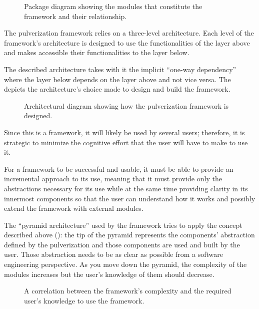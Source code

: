 \begin{figure}
    \centering
    \caption{Package diagram showing the modules that constitute the framework and their relationship.}
    \label{fig:package-diagram}
\end{figure}

The pulverization framework relies on a three-level architecture. Each level of the framework's architecture is designed to use the functionalities
of the layer above and makes accessible their functionalities to the layer below.

The described architecture takes with it the implicit ``one-way dependency'' where the layer below depends on the layer above and not vice versa.
The~ depicts the architecture's choice made to design and build the framework.

\begin{figure}
    \centering
    \caption{Architectural diagram showing how the pulverization framework is designed.}
    \label{fig:framework-architecture}
\end{figure}

Since this is a framework, it will likely be used by several users; therefore, it is strategic to minimize the cognitive effort that the user will
have to make to use it.

For a framework to be successful and usable, it must be able to provide an incremental approach to its use,
meaning that it must provide only the abstractions necessary for its use while at the same time providing clarity in its innermost components so that
the user can understand how it works and possibly extend the framework with external modules.

The ``pyramid architecture'' used by the framework tries to apply the concept described above ():
the tip of the pyramid represents the components' abstraction defined by the pulverization and those components are used and built by the user.
Those abstraction needs to be as clear as possible from a software engineering perspective.
As you move down the pyramid, the complexity of the modules increases but the user's knowledge of them should decrease.

\begin{figure}
    \centering
    \caption{A correlation between the framework's complexity and the required user's knowledge to use the framework.}
    \label{fig:pyramid-user-knowledge}
\end{figure}

